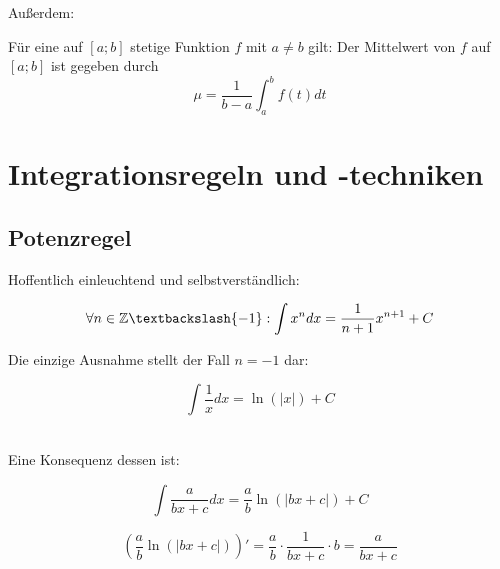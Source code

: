Außerdem:
\begin{Definition}
  Für eine auf $[a;b]$ stetige Funktion $f$ mit $a \neq b$ gilt: Der Mittelwert von $f$ auf $[a;b]$ ist gegeben durch $$\mu = \dfrac{1}{b-a} \int_a^b f(t)dt$$
\end{Definition}

\section{Integrationsregeln und -techniken}

\subsection{Potenzregel}
Hoffentlich einleuchtend und selbstverständlich:
\begin{Theorem}
  $$\forall n \in \Z \textbackslash \{ -1\}:\int  x^n dx = \frac{1}{n+1}x^{n+1} + C$$
\end{Theorem}
\begin{Bemerkung}
  Die einzige Ausnahme stellt der Fall $n=-1$ dar:
  \begin{Theorem}
    $$\int \dfrac{1}{x} dx = \ln(|x|) + C$$
  \end{Theorem}
\end{Bemerkung}\\
Eine Konsequenz dessen ist:
\begin{Theorem}
  $$\int \dfrac{a}{bx+c} dx = \dfrac{a}{b}\ln(|bx+c|) + C$$
\end{Theorem}
\begin{Beweis}
  $$\left(\dfrac{a}{b}\ln(|bx+c|)\right)' = \dfrac{a}{b}\cdot \dfrac{1}{bx+c}\cdot b = \dfrac{a}{bx+c}$$
\end{Beweis}

